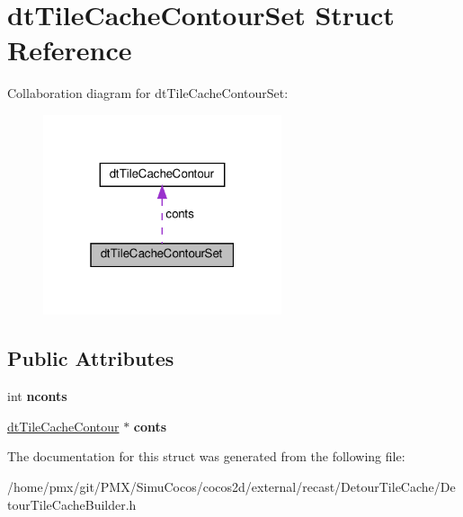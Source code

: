 \hypertarget{structdtTileCacheContourSet}{}\section{dt\+Tile\+Cache\+Contour\+Set Struct Reference}
\label{structdtTileCacheContourSet}


Collaboration diagram for dt\+Tile\+Cache\+Contour\+Set\+:
\nopagebreak
\begin{figure}[H]
\begin{center}
\leavevmode
\includegraphics[width=199pt]{structdtTileCacheContourSet__coll__graph}
\end{center}
\end{figure}
\subsection*{Public Attributes}
\begin{DoxyCompactItemize}
\item 
\mbox{\label{structdtTileCacheContourSet_a337ee629794b3eb22f605f531990456e}} 
int {\bfseries nconts}
\item 
\mbox{\label{structdtTileCacheContourSet_a1a0d76cb0c6192e35fb93e837b515e83}} 
\hyperlink{structdtTileCacheContour}{dt\+Tile\+Cache\+Contour} $\ast$ {\bfseries conts}
\end{DoxyCompactItemize}


The documentation for this struct was generated from the following file\+:\begin{DoxyCompactItemize}
\item 
/home/pmx/git/\+P\+M\+X/\+Simu\+Cocos/cocos2d/external/recast/\+Detour\+Tile\+Cache/Detour\+Tile\+Cache\+Builder.\+h\end{DoxyCompactItemize}
